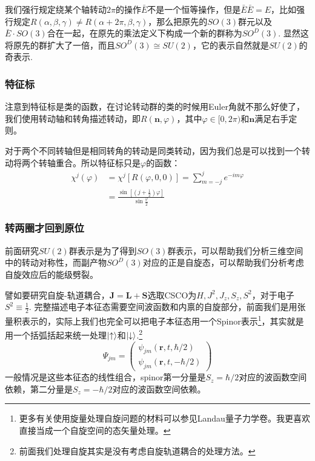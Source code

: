 我们强行规定绕某个轴转动$2\pi$的操作$\bar{E}$不是一个恒等操作，但是$\bar{E}\bar{E}=E$，比如强行规定$R(\alpha,\beta,\gamma)\neq R(\alpha+2\pi,\beta,\gamma)$，那么把原先的$SO(3)$群元以及$\bar E\cdot SO(3)$合在一起，在原先的乘法定义下构成一个新的群称为$SO^D(3)$. 显然这将原先的群扩大了一倍，而且$SO^D(3)\cong SU(2)$，它的表示自然就是$SU(2)$的奇表示.
\subsubsection*{特征标}
注意到特征标是类的函数，在讨论转动群的类的时候用Euler角就不那么好使了，我们使用转动轴和转角描述转动，即$R(\mathbf{n},\varphi)$，其中$\varphi\in [0,2\pi)$和$\mathbf{n}$满足右手定则。

对于两个不同转轴但是相同转角的转动是同类转动，因为我们总是可以找到一个转动将两个转轴重合。所以特征标只是$\varphi$的函数：
\begin{equation}
	\begin{aligned}
	\chi^j(\varphi)&=\chi^j\left[R(\varphi,0,0)\right]=\sum_{m=-j}^je^{-im\varphi}\\
	&=\boxed{\frac{\sin\left[\left(j+\frac{1}{2}\right)\varphi\right]}{\sin\frac{\varphi}{2}}}
	\end{aligned}
\end{equation}

\subsubsection*{转两圈才回到原位}
前面研究$SU(2)$群表示是为了得到$SO(3)$群表示，可以帮助我们分析三维空间中的转动对称性，而副产物$SO^D(3)$对应的正是自旋态，可以帮助我们分析考虑自旋效应后的能级劈裂。

譬如要研究自旋-轨道耦合，$\mathbf{J}=\mathbf{L}+\mathbf{S}$选取CSCO为$H,J^2,J_z,S_z,S^2$，对于电子$S^2\equiv\frac{1}{2}$. 完整描述电子本征态需要空间波函数和内禀的自旋部分，前面我们是用张量积表示的，实际上我们也完全可以把电子本征态用一个Spinor表示\footnote{更多有关使用旋量处理自旋问题的材料可以参见Landau量子力学卷。我更喜欢直接当成一个自旋空间的态矢量处理。}，其实就是用一个括弧括起来统一处理$\ket{\uparrow}$和$\ket{\downarrow}$.\footnote{前面我们处理自旋其实是没有考虑自旋轨道耦合的处理方法。}
\[\Psi_{jm}=\begin{pmatrix}
	\psi_{jm}(\mathbf{r},t,\hbar/2)\\
	\psi_{jm}(\mathbf{r},t,-\hbar/2)
\end{pmatrix}\]
一般情况是这些本征态的线性组合，spinor第一分量是$S_z=\hbar/2$对应的波函数空间依赖，第二分量是$S_z=-\hbar/2$对应的波函数空间依赖。

